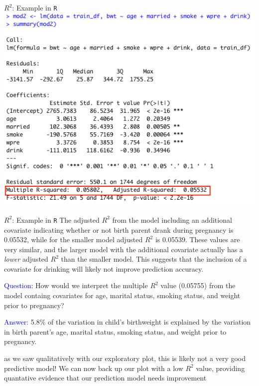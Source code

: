 \documentclass[10pt,t]{beamer}
\begin{document}
\begin{frame}{$R^2$: Example in \texttt{R}}
\centering \includegraphics[scale=0.4]{r2_example2.png}
\end{frame}


\begin{frame}{$R^2$: Example in \texttt{R}}
The adjusted $R^2$ from the model including an additional covariate indicating whether or not birth parent drank during pregnancy is 0.05532, while for the smaller model adjusted $R^2$ is 0.05539. These values are very similar, and the larger model with the additional covariate actually has a \textit{lower} adjusted $R^2$ than the smaller model. This suggests that the inclusion of a covariate for drinking will likely not improve prediction accuracy. \pause

\vspace{0.3cm}

\textcolor{blue}{Question:} How would we interpret the multiple $R^2$ value (0.05755) from the model containg covariates for age, marital status, smoking status, and weight prior to pregnancy? \pause

\vspace{0.3cm}

\textcolor{blue}{Answer:} 5.8\% of the variation in child's birthweight is explained by the variation in birth parent's age, marital status, smoking status, and weight prior to pregnancy. 

\vspace{0.3cm}

\small *as we saw qualitatively with our exploratory plot, this is likely not a very good predictive model! We can now back up our plot with a low $R^2$ value, providing quantative evidence that our prediction model needs improvement
\end{frame}
\end{document}
